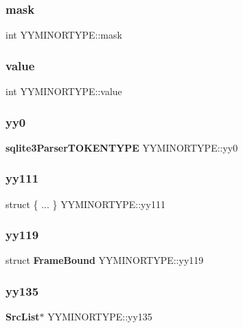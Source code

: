 \subsubsection{mask}
{\footnotesize\ttfamily int Y\+Y\+M\+I\+N\+O\+R\+T\+Y\+P\+E\+::mask}

\mbox{\label{union_y_y_m_i_n_o_r_t_y_p_e_abf0258f4d32c04817d6e9181f01586ad}} 
\subsubsection{value}
{\footnotesize\ttfamily int Y\+Y\+M\+I\+N\+O\+R\+T\+Y\+P\+E\+::value}

\mbox{\label{union_y_y_m_i_n_o_r_t_y_p_e_a827d6a1bc7ac8df062b3f419db3f50ac}} 
\subsubsection{yy0}
{\footnotesize\ttfamily \textbf{ sqlite3\+Parser\+T\+O\+K\+E\+N\+T\+Y\+PE} Y\+Y\+M\+I\+N\+O\+R\+T\+Y\+P\+E\+::yy0}

\mbox{\label{union_y_y_m_i_n_o_r_t_y_p_e_ab230bb0139850acabed7045b28d71485}} 
\subsubsection{yy111}
{\footnotesize\ttfamily struct \{ ... \}   Y\+Y\+M\+I\+N\+O\+R\+T\+Y\+P\+E\+::yy111}

\mbox{\label{union_y_y_m_i_n_o_r_t_y_p_e_a07248855e73f4b930868dc36128adacb}} 
\subsubsection{yy119}
{\footnotesize\ttfamily struct \textbf{ Frame\+Bound} Y\+Y\+M\+I\+N\+O\+R\+T\+Y\+P\+E\+::yy119}

\mbox{\label{union_y_y_m_i_n_o_r_t_y_p_e_a8ffa07cd82f5672400d16af5f723a54f}} 
\subsubsection{yy135}
{\footnotesize\ttfamily \textbf{ Src\+List}$\ast$ Y\+Y\+M\+I\+N\+O\+R\+T\+Y\+P\+E\+::yy135}

